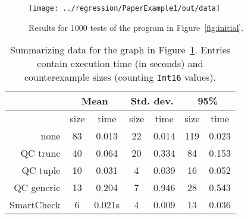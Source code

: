 \documentclass{sigplanconf}
\newenvironment{code}{\begin{alltt}\footnotesize}{\end{alltt}}
\newcommand{\ttp}[1]{\texttt{#1}}
\begin{document}
%


%

\begin{figure}[ht]
\texttt{[image: ../regression/PaperExample1/out/data]}
  \caption{Results for 1000 tests of the program in Figure~\ref{fig:initial}.}
  \label{fig:graphs}
\end{figure}

\begin{table}[ht]
\footnotesize
  \begin{center}
    \begin{tabular}{|r||c|c|c|c|c|c|}
\hline

              & \multicolumn{2}{c}{Mean} & \multicolumn{2}{c}{Std. dev.} &
\multicolumn{2}{c}{95\%}\\\hline
              & size & time  & size & time & size & time \\\hline\hline
none          & 83 & 0.013   & 22 & 0.014   & 119 & 0.023\\\hline
QC trunc      & 40 & 0.064   & 20 & 0.334   & 84 & 0.153\\\hline
QC tuple      & 10 & 0.031   & 4  & 0.039   & 16 & 0.052\\\hline
QC generic    & 13 & 0.204   & 7  & 0.946   & 28 & 0.543\\\hline
SmartCheck    & 6 & 0.021s   & 4  & 0.009   & 13 & 0.036\\\hline

    \end{tabular}
  \end{center}
  \caption{Summarizing data for the graph in Figure~\ref{fig:graphs}. Entries
    contain execution time (in seconds) and counterexample sizes (counting
    \ttp{Int16} values).}
  \label{table:results}
\end{table}
\end{document}
